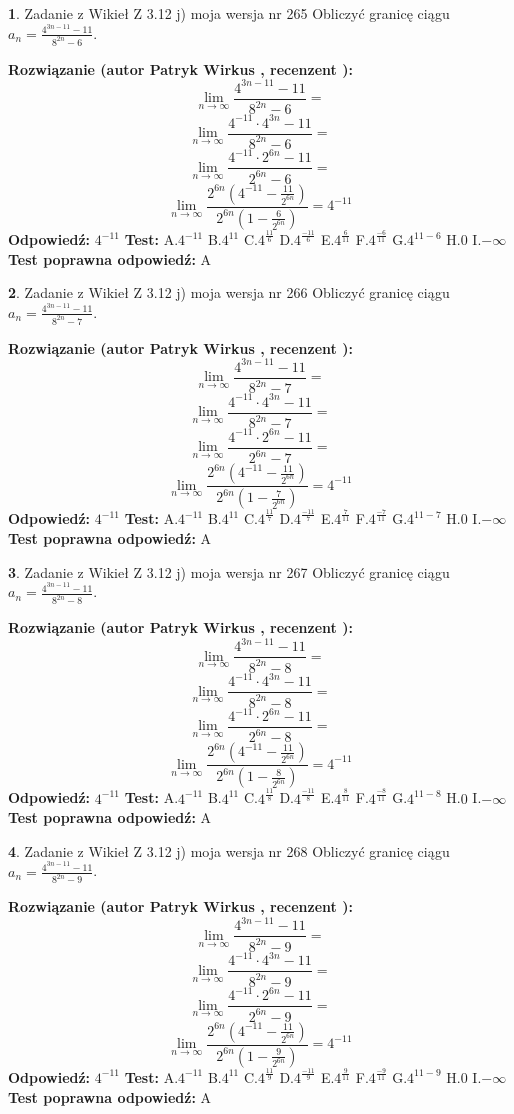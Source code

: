 \documentclass[12pt, a4paper]{article}
\theoremstyle{definition} %
\newtheorem{zad}{}
\newcommand{\zadStart}[1]{\begin{zad}#1\newline}
\newcommand{\zadStop}{\end{zad}}
\newcommand{\rozwStart}[2]{\noindent \textbf{Rozwiązanie (autor #1 , recenzent #2): }\newline}
\newcommand{\rozwStop}{\newline}
\newcommand{\odpStart}{\noindent \textbf{Odpowiedź:}\newline}
\newcommand{\odpStop}{\newline}
\newcommand{\testStart}{\noindent \textbf{Test:}\newline}
\newcommand{\testStop}{\newline}
\newcommand{\kluczStart}{\noindent \textbf{Test poprawna odpowiedź:}\newline}
\newcommand{\kluczStop}{\newline}
\begin{document}
\zadStart{Zadanie z Wikieł Z 3.12 j) moja wersja nr 265}
Obliczyć granicę ciągu $a_{n}=\frac{4^{3n-11}-11}{8^{2n}-6}$.
\zadStop
\rozwStart{Patryk Wirkus}{}
$$\lim\limits_{n\to\infty}\frac{4^{3n-11}-11}{8^{2n}-6}=$$
$$\lim\limits_{n\to\infty}\frac{4^{-11} \cdot 4^{3n}-11}{8^{2n}-6}=$$
$$\lim\limits_{n\to\infty}\frac{4^{-11} \cdot 2^{6n}-11}{2^{6n}-6}=$$
$$\lim\limits_{n\to\infty}\frac{2^{6n}(4^{-11} - \frac{11}{2^{6n}})}{2^{6n}(1-\frac{6}{2^{6n}})}= 4^{-11}$$
\rozwStop
\odpStart
$4^{-11}$
\odpStop
\testStart
A.$4^{-11}$
B.$4^{11}$
C.$4^{\frac{11}{6}}$
D.$4^{\frac{-11}{6}}$
E.$4^{\frac{6}{11}}$
F.$4^{\frac{-6}{11}}$
G.$4^{11-6}$
H.$0$
I.$-\infty$
\testStop
\kluczStart
A
\kluczStop



\zadStart{Zadanie z Wikieł Z 3.12 j) moja wersja nr 266}
Obliczyć granicę ciągu $a_{n}=\frac{4^{3n-11}-11}{8^{2n}-7}$.
\zadStop
\rozwStart{Patryk Wirkus}{}
$$\lim\limits_{n\to\infty}\frac{4^{3n-11}-11}{8^{2n}-7}=$$
$$\lim\limits_{n\to\infty}\frac{4^{-11} \cdot 4^{3n}-11}{8^{2n}-7}=$$
$$\lim\limits_{n\to\infty}\frac{4^{-11} \cdot 2^{6n}-11}{2^{6n}-7}=$$
$$\lim\limits_{n\to\infty}\frac{2^{6n}(4^{-11} - \frac{11}{2^{6n}})}{2^{6n}(1-\frac{7}{2^{6n}})}= 4^{-11}$$
\rozwStop
\odpStart
$4^{-11}$
\odpStop
\testStart
A.$4^{-11}$
B.$4^{11}$
C.$4^{\frac{11}{7}}$
D.$4^{\frac{-11}{7}}$
E.$4^{\frac{7}{11}}$
F.$4^{\frac{-7}{11}}$
G.$4^{11-7}$
H.$0$
I.$-\infty$
\testStop
\kluczStart
A
\kluczStop



\zadStart{Zadanie z Wikieł Z 3.12 j) moja wersja nr 267}
Obliczyć granicę ciągu $a_{n}=\frac{4^{3n-11}-11}{8^{2n}-8}$.
\zadStop
\rozwStart{Patryk Wirkus}{}
$$\lim\limits_{n\to\infty}\frac{4^{3n-11}-11}{8^{2n}-8}=$$
$$\lim\limits_{n\to\infty}\frac{4^{-11} \cdot 4^{3n}-11}{8^{2n}-8}=$$
$$\lim\limits_{n\to\infty}\frac{4^{-11} \cdot 2^{6n}-11}{2^{6n}-8}=$$
$$\lim\limits_{n\to\infty}\frac{2^{6n}(4^{-11} - \frac{11}{2^{6n}})}{2^{6n}(1-\frac{8}{2^{6n}})}= 4^{-11}$$
\rozwStop
\odpStart
$4^{-11}$
\odpStop
\testStart
A.$4^{-11}$
B.$4^{11}$
C.$4^{\frac{11}{8}}$
D.$4^{\frac{-11}{8}}$
E.$4^{\frac{8}{11}}$
F.$4^{\frac{-8}{11}}$
G.$4^{11-8}$
H.$0$
I.$-\infty$
\testStop
\kluczStart
A
\kluczStop



\zadStart{Zadanie z Wikieł Z 3.12 j) moja wersja nr 268}
Obliczyć granicę ciągu $a_{n}=\frac{4^{3n-11}-11}{8^{2n}-9}$.
\zadStop
\rozwStart{Patryk Wirkus}{}
$$\lim\limits_{n\to\infty}\frac{4^{3n-11}-11}{8^{2n}-9}=$$
$$\lim\limits_{n\to\infty}\frac{4^{-11} \cdot 4^{3n}-11}{8^{2n}-9}=$$
$$\lim\limits_{n\to\infty}\frac{4^{-11} \cdot 2^{6n}-11}{2^{6n}-9}=$$
$$\lim\limits_{n\to\infty}\frac{2^{6n}(4^{-11} - \frac{11}{2^{6n}})}{2^{6n}(1-\frac{9}{2^{6n}})}= 4^{-11}$$
\rozwStop
\odpStart
$4^{-11}$
\odpStop
\testStart
A.$4^{-11}$
B.$4^{11}$
C.$4^{\frac{11}{9}}$
D.$4^{\frac{-11}{9}}$
E.$4^{\frac{9}{11}}$
F.$4^{\frac{-9}{11}}$
G.$4^{11-9}$
H.$0$
I.$-\infty$
\testStop
\kluczStart
A
\kluczStop
\end{document}
